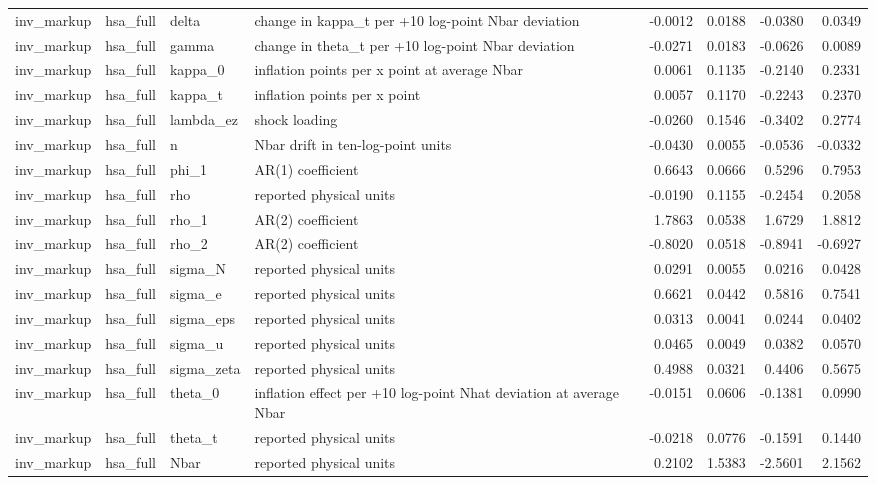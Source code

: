 \begin{tabular}{llllrrrr}
inv\_markup & hsa\_full & delta & change in kappa\_t per +10 log-point Nbar deviation & -0.0012 & 0.0188 & -0.0380 & 0.0349 \\
inv\_markup & hsa\_full & gamma & change in theta\_t per +10 log-point Nbar deviation & -0.0271 & 0.0183 & -0.0626 & 0.0089 \\
inv\_markup & hsa\_full & kappa\_0 & inflation points per x point at average Nbar & 0.0061 & 0.1135 & -0.2140 & 0.2331 \\
inv\_markup & hsa\_full & kappa\_t & inflation points per x point & 0.0057 & 0.1170 & -0.2243 & 0.2370 \\
inv\_markup & hsa\_full & lambda\_ez & shock loading & -0.0260 & 0.1546 & -0.3402 & 0.2774 \\
inv\_markup & hsa\_full & n & Nbar drift in ten-log-point units & -0.0430 & 0.0055 & -0.0536 & -0.0332 \\
inv\_markup & hsa\_full & phi\_1 & AR(1) coefficient & 0.6643 & 0.0666 & 0.5296 & 0.7953 \\
inv\_markup & hsa\_full & rho & reported physical units & -0.0190 & 0.1155 & -0.2454 & 0.2058 \\
inv\_markup & hsa\_full & rho\_1 & AR(2) coefficient & 1.7863 & 0.0538 & 1.6729 & 1.8812 \\
inv\_markup & hsa\_full & rho\_2 & AR(2) coefficient & -0.8020 & 0.0518 & -0.8941 & -0.6927 \\
inv\_markup & hsa\_full & sigma\_N & reported physical units & 0.0291 & 0.0055 & 0.0216 & 0.0428 \\
inv\_markup & hsa\_full & sigma\_e & reported physical units & 0.6621 & 0.0442 & 0.5816 & 0.7541 \\
inv\_markup & hsa\_full & sigma\_eps & reported physical units & 0.0313 & 0.0041 & 0.0244 & 0.0402 \\
inv\_markup & hsa\_full & sigma\_u & reported physical units & 0.0465 & 0.0049 & 0.0382 & 0.0570 \\
inv\_markup & hsa\_full & sigma\_zeta & reported physical units & 0.4988 & 0.0321 & 0.4406 & 0.5675 \\
inv\_markup & hsa\_full & theta\_0 & inflation effect per +10 log-point Nhat deviation at average Nbar & -0.0151 & 0.0606 & -0.1381 & 0.0990 \\
inv\_markup & hsa\_full & theta\_t & reported physical units & -0.0218 & 0.0776 & -0.1591 & 0.1440 \\
inv\_markup & hsa\_full & Nbar & reported physical units & 0.2102 & 1.5383 & -2.5601 & 2.1562 \\

\end{tabular}
